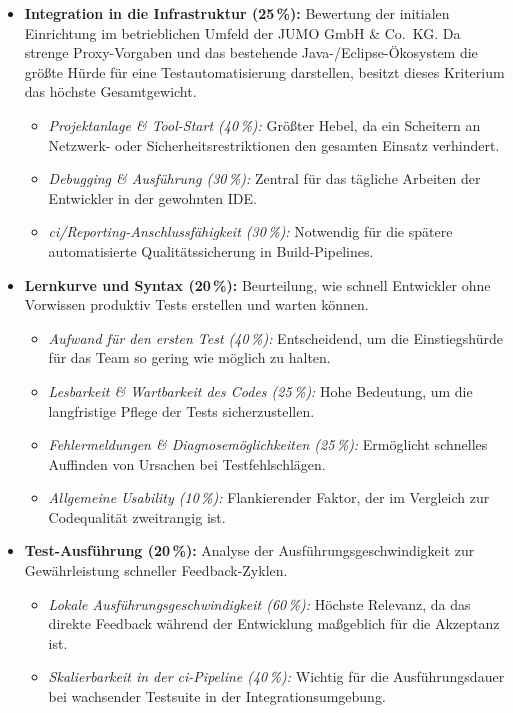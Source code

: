 \begin{itemize}
    \item \textbf{Integration in die Infrastruktur (25\,\%):} Bewertung der initialen Einrichtung im betrieblichen Umfeld der JUMO GmbH \& Co.\ KG. Da strenge Proxy-Vorgaben und das bestehende Java-/Eclipse-Ökosystem die größte Hürde für eine Testautomatisierung darstellen, besitzt dieses Kriterium das höchste Gesamtgewicht.
    \begin{itemize}
        \item \textit{Projektanlage \& Tool-Start (40\,\%):} Größter Hebel, da ein Scheitern an Netzwerk- oder Sicherheitsrestriktionen den gesamten Einsatz verhindert.
        \item \textit{Debugging \& Ausführung (30\,\%):} Zentral für das tägliche Arbeiten der Entwickler in der gewohnten IDE.
        \item \textit{\gls{ci}/Reporting-Anschlussfähigkeit (30\,\%):} Notwendig für die spätere automatisierte Qualitätssicherung in Build-Pipelines.
    \end{itemize}

    \item \textbf{Lernkurve und Syntax (20\,\%):} Beurteilung, wie schnell Entwickler ohne Vorwissen produktiv Tests erstellen und warten können.
    \begin{itemize}
        \item \textit{Aufwand für den ersten Test (40\,\%):} Entscheidend, um die Einstiegshürde für das Team so gering wie möglich zu halten.
        \item \textit{Lesbarkeit \& Wartbarkeit des Codes (25\,\%):} Hohe Bedeutung, um die langfristige Pflege der Tests sicherzustellen.
        \item \textit{Fehlermeldungen \& Diagnosemöglichkeiten (25\,\%):} Ermöglicht schnelles Auffinden von Ursachen bei Testfehlschlägen.
        \item \textit{Allgemeine Usability (10\,\%):} Flankierender Faktor, der im Vergleich zur Codequalität zweitrangig ist.
    \end{itemize}

    \item \textbf{Test-Ausführung (20\,\%):} Analyse der Ausführungsgeschwindigkeit zur Gewährleistung schneller Feedback-Zyklen.
    \begin{itemize}
        \item \textit{Lokale Ausführungsgeschwindigkeit (60\,\%):} Höchste Relevanz, da das direkte Feedback während der Entwicklung maßgeblich für die Akzeptanz ist.
        \item \textit{Skalierbarkeit in der \gls{ci}-Pipeline (40\,\%):} Wichtig für die Ausführungsdauer bei wachsender Testsuite in der Integrationsumgebung.
    \end{itemize}


\end{itemize}
